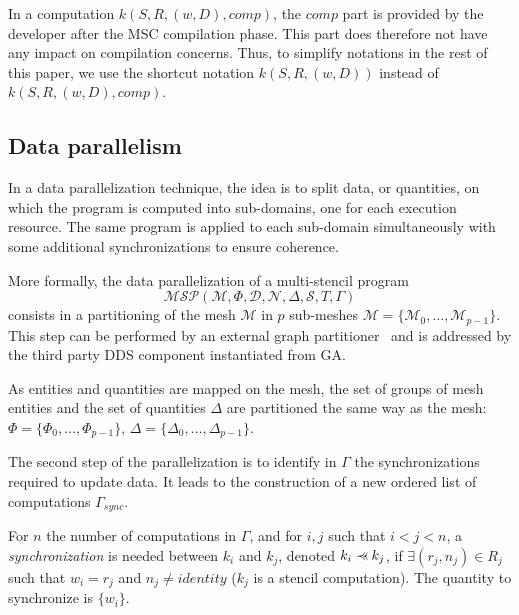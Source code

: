 In a computation $k(S,R,(w,D),comp)$, the $comp$ part is provided by the developer after the MSC compilation phase.
This part does therefore not have any impact on compilation concerns.
Thus, to simplify notations in the rest of this paper, we use the shortcut notation $k(S,R,(w,D))$ instead of $k(S,R,(w,D),comp)$.

\subsection{Data parallelism}
\label{sect:dataparal}
In a data parallelization technique, the idea is to split data, or quantities, on which the program is computed into
sub-domains, one for each execution resource.
The same program is applied to each sub-domain simultaneously with some additional synchronizations to ensure coherence.

\medskip
More formally, the data parallelization of a multi-stencil program 
\begin{equation*}
\mathcal{MSP}(\mathcal{M},\Phi,\mathcal{D},\mathcal{N},\Delta, \mathcal{S},T,\Gamma)
\end{equation*}
consists in a partitioning of the mesh $\mathcal{M}$ in $p$ sub-meshes $\mathcal{M}=\{\mathcal{M}_0,\dots,\mathcal{M}_{p-1}\}$.
This step can be performed by an external graph partitioner~\cite{Pellegrini:1996:SSP:645560.658570,DBLP:conf/ieeehpcs/HeleneS13,lachat:hal-00768916} and is addressed by the third party DDS component instantiated from GA. 

As entities and quantities are mapped on the mesh, the set of groups of mesh entities and the set of quantities $\Delta$ are partitioned the same way as the mesh: $\Phi=\{\Phi_0,\dots,\Phi_{p-1}\}$, $\Delta=\{\Delta_0,\dots,\Delta_{p-1}\}$. 

The second step of the parallelization is to identify in $\Gamma$ the synchronizations required to update data.
It leads to the construction of a new ordered list of computations $\Gamma_{sync}$.

\begin{mydef}
For $n$ the number of computations in $\Gamma$, and for $i,j$ such that $i<j<n$, a \textit{synchronization} is needed between $k_i$ and $k_j$, denoted $k_i \pprec k_j$, if $\exists (r_j,n_j) \in R_j$ such that $w_i=r_j$ and $n_j\neq identity$ ($k_j$ is a stencil computation). The quantity to synchronize is $\{w_i\}$.
\label{def:sync}
\end{mydef}


